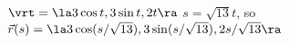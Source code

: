 {$\vrt = \la 3\cos t,3\sin t, 2t\ra$
}
{$s = \sqrt{13}t$, so $\vec r(s)  = \la 3\cos (s/\sqrt{13}), 3\sin (s/\sqrt{13}), 2s/\sqrt{13}\ra$
}